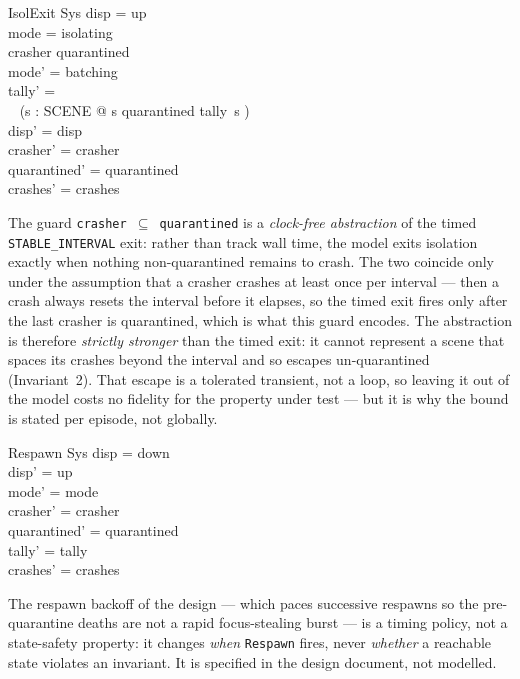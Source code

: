 \documentclass[a4paper,10pt,fleqn]{article}
\begin{document}
\begin{schema}{IsolExit}
  \Delta Sys
\where
  disp = up \\
  mode = isolating \\
  crasher \subseteq quarantined \\
  mode' = batching \\
  tally' = \\
  \quad~ (\lambda s : SCENE @ \IF s \in quarantined \THEN tally~s ) \\
  disp' = disp \\
  crasher' = crasher \\
  quarantined' = quarantined \\
  crashes' = crashes
\end{schema}

The guard \texttt{crasher $\subseteq$ quarantined} is a \emph{clock-free
abstraction} of the timed \texttt{STABLE\_INTERVAL} exit: rather than track wall
time, the model exits isolation exactly when nothing non-quarantined remains to
crash.  The two coincide only under the assumption that a crasher crashes at least
once per interval --- then a crash always resets the interval before it elapses,
so the timed exit fires only after the last crasher is quarantined, which is what
this guard encodes.  The abstraction is therefore \emph{strictly stronger} than
the timed exit: it cannot represent a scene that spaces its crashes beyond the
interval and so escapes un-quarantined (Invariant~2).  That escape is a tolerated
transient, not a loop, so leaving it out of the model costs no fidelity for the
property under test --- but it is why the bound is stated per episode, not
globally.

\begin{schema}{Respawn}
  \Delta Sys
\where
  disp = down \\
  disp' = up \\
  mode' = mode \\
  crasher' = crasher \\
  quarantined' = quarantined \\
  tally' = tally \\
  crashes' = crashes
\end{schema}

The respawn backoff of the design --- which paces successive respawns so the
pre-quarantine deaths are not a rapid focus-stealing burst --- is a timing
policy, not a state-safety property: it changes \emph{when} \texttt{Respawn}
fires, never \emph{whether} a reachable state violates an invariant.  It is
specified in the design document, not modelled.
\end{document}
